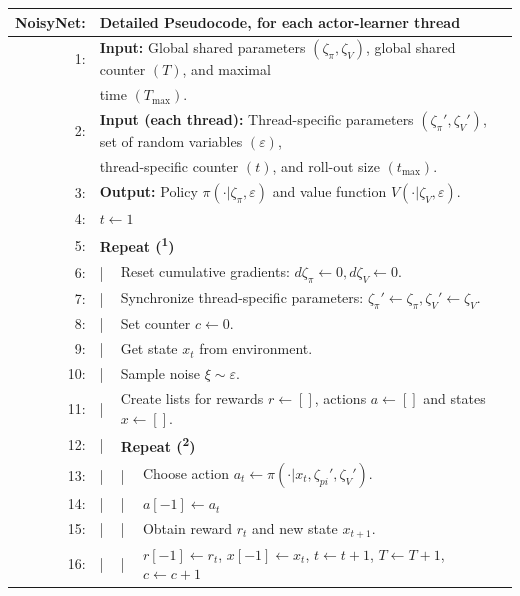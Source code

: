 \begin{table}[h!]
  \centering
  \begin{tabular}{rlll}
    \hline\hline
    \textbf{NoisyNet:} & \multicolumn{3}{l}{Detailed Pseudocode, for each actor-learner thread}\\
    \hline
    1: & \multicolumn{3}{l}{\textbf{Input:} Global shared parameters $(\zeta_{\pi}, \zeta_{V})$, global shared counter $(T)$, and maximal}\\
    & \multicolumn{3}{l}{time $(T_{\text{max}})$.}\\
    2: & \multicolumn{3}{l}{\textbf{Input (each thread):} Thread-specific parameters $(\zeta_{\pi}', \zeta_{V}')$, set of random variables $(\varepsilon)$,}\\
    & \multicolumn{3}{l}{thread-specific counter $(t)$, and roll-out size $(t_{\text{max}})$.}\\
    3: & \multicolumn{3}{l}{\textbf{Output:} Policy $\pi(\cdot|\zeta_{\pi}, \varepsilon)$ and value function $V(\cdot|\zeta_{V},\varepsilon)$.}\\
    4: & \multicolumn{3}{l}{$t \leftarrow 1$}\\
    5: & \multicolumn{3}{l}{\textbf{Repeat (\textsuperscript{1})}}\\
    6: & | & \multicolumn{2}{l}{Reset cumulative gradients: $d\zeta_{\pi} \leftarrow 0, d\zeta_{V} \leftarrow 0$.}\\
    7: & | & \multicolumn{2}{l}{Synchronize thread-specific parameters: $\zeta_{\pi}' \leftarrow \zeta_{\pi}, \zeta_{V}' \leftarrow \zeta_{V}$.}\\
    8: & | & \multicolumn{2}{l}{Set counter $c \leftarrow 0$.}\\
    9: & | & \multicolumn{2}{l}{Get state $x_{t}$ from environment.}\\
    10: & | & \multicolumn{2}{l}{Sample noise $\xi \sim \varepsilon$.}\\
    11: & | & \multicolumn{2}{l}{Create lists for rewards $r \leftarrow [ ]$, actions $a \leftarrow [ ]$ and states $x \leftarrow [ ]$.}\\
    12: & | & \multicolumn{2}{l}{\textbf{Repeat (\textsuperscript{2})}}\\
    13: & | & | & Choose action $a_{t} \leftarrow \pi(\cdot|x_{t}, \zeta_{pi}', \zeta_{V}')$.\\
    14: & | & | & $a[-1] \leftarrow a_{t}$\\
    15: & | & | & Obtain reward $r_{t}$ and new state $x_{t+1}$.\\
    16: & | & | & $r[-1] \leftarrow r_{t}$, $x[-1] \leftarrow x_{t}$, $t \leftarrow t + 1$, $T \leftarrow T + 1$, $c \leftarrow c + 1$\\

\end{tabular}
\end{table}
